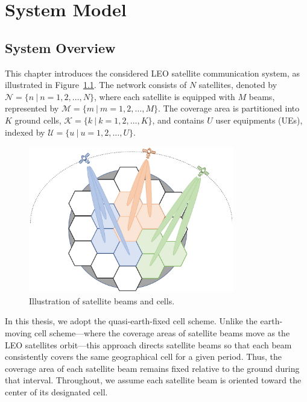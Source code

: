 \chapter{System Model}
\label{chap:model}
\section{System Overview}

This chapter introduces the considered LEO satellite communication system, as illustrated in Figure~\ref{fig_system}. The network consists of $N$ satellites, denoted by $\mathcal{N} = \{n\ |\ n = 1, 2, \ldots, N\}$, where each satellite is equipped with $M$ beams, represented by $\mathcal{M} = \{m\ |\ m = 1, 2, \ldots, M\}$. The coverage area is partitioned into $K$ ground cells, $\mathcal{K} = \{k\ |\ k = 1, 2, \ldots, K\}$, and contains $U$ user equipments (UEs), indexed by $\mathcal{U} = \{u\ |\ u = 1, 2, \ldots, U\}$.

\begin{figure}[h!]
    \centering
    \includegraphics[width=0.8\textwidth]{figure/system overview.pdf}
    \caption{Illustration of satellite beams and cells.}
    \label{fig_system}
\end{figure}

In this thesis, we adopt the quasi-earth-fixed cell scheme. Unlike the earth-moving cell scheme—where the coverage areas of satellite beams move as the LEO satellites orbit—this approach directs satellite beams so that each beam consistently covers the same geographical cell for a given period. Thus, the coverage area of each satellite beam remains fixed relative to the ground during that interval. Throughout, we assume each satellite beam is oriented toward the center of its designated cell.

